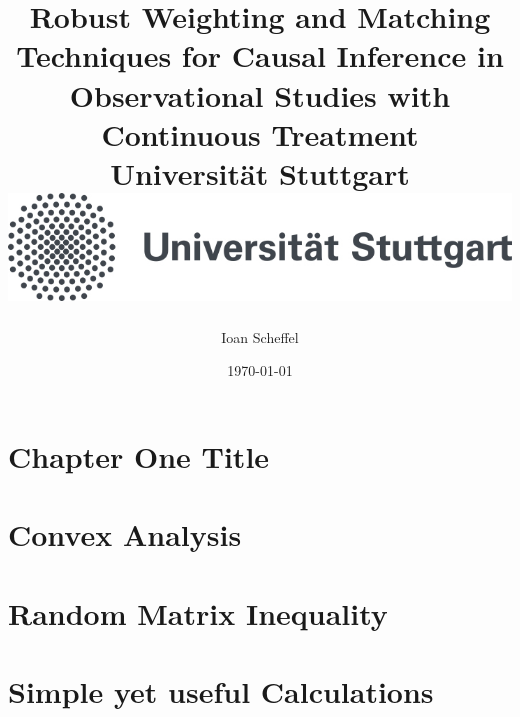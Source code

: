 \documentclass[12pt]{report}
\title{
{Robust Weighting and Matching Techniques for Causal Inference in Observational Studies with Continuous Treatment}\\
{\large Universität Stuttgart}\\
{\includegraphics{unistuttgart_logo_deutsch.jpg}}
}
\author{Ioan Scheffel}
\date{\today}
\begin{document}
\maketitle 

\tableofcontents 

\chapter{Chapter One Title}


\chapter{Convex Analysis}


\chapter{Random Matrix Inequality}


\chapter{Simple yet useful Calculations}

\end{document}
